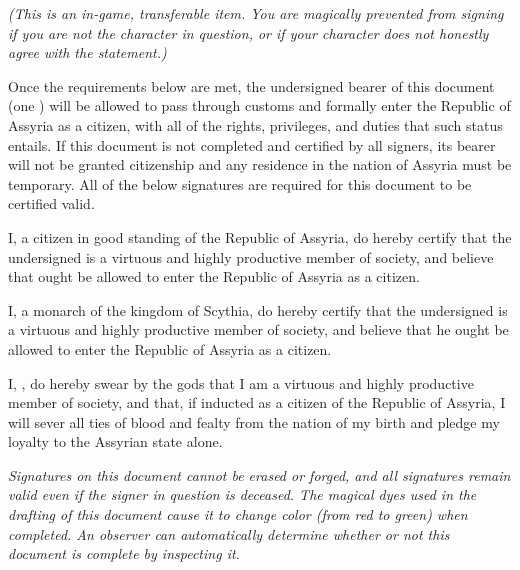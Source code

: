 \documentclass[white]{Kos}
\begin{document}
\name{\wAssyriaPapers{}}

\emph{(This is an in-game, transferable item. You are magically prevented from signing if you are not the character in question, or if your character does not honestly agree with the statement.)}

Once the requirements below are met, the undersigned bearer of this document (one \cWard{\MYname}) will be allowed to pass through customs and formally enter the Republic of Assyria as a citizen, with all of the rights, privileges, and duties that such status entails. If this document is not completed and certified by all signers, its bearer will not be granted citizenship and any residence in the nation of Assyria must be temporary. All of the below signatures are required for this document to be certified valid.

I, a citizen in good standing of the Republic of Assyria, do hereby certify that the undersigned \cWard{\MYname} is a virtuous and highly productive member of society, and believe that \cWard{\they} ought be allowed to enter the Republic of Assyria as a citizen.

\hrulefill

I, a monarch of the kingdom of Scythia, do hereby certify that the undersigned \cWard{\MYname} is a virtuous and highly productive member of society, and believe that he ought be allowed to enter the Republic of Assyria as a citizen.

\hrulefill

I, \cWard{\MYname}, do hereby swear by the gods that I am a virtuous and highly productive member of society, and that, if inducted as a citizen of the Republic of Assyria, I will sever all ties of blood and fealty from the nation of my birth and pledge my loyalty to the Assyrian state alone.

\hrulefill

\cWard{\MYname}

\emph{Signatures on this document cannot be erased or forged, and all signatures remain valid even if the signer in question is deceased. The magical dyes used in the drafting of this document cause it to change color (from red to green) when completed. An observer can automatically determine whether or not this document is complete by inspecting it.}
\end{document}
